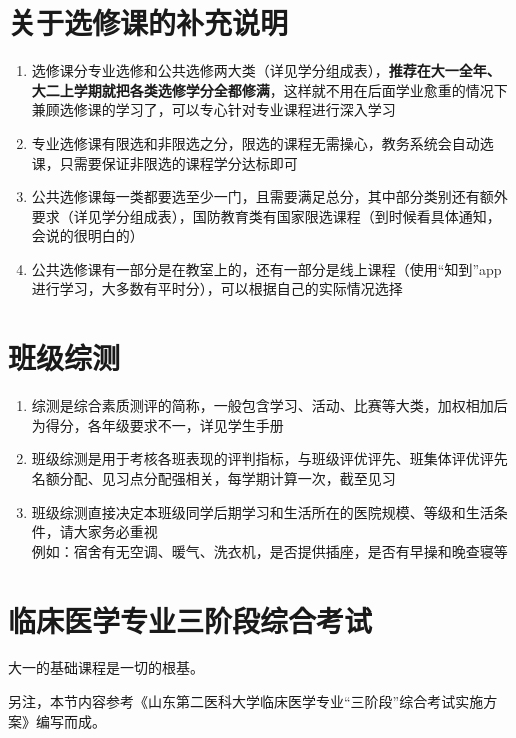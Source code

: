 \section[关于选修课的补充说明]{关于选修课的补充说明}
\begin{enumerate}
    \item 选修课分专业选修和公共选修两大类（详见学分组成表），\textbf{推荐在大一全年、大二上学期就把各类选修学分全都修满}，这样就不用在后面学业愈重的情况下兼顾选修课的学习了，可以专心针对专业课程进行深入学习
    \item 专业选修课有限选和非限选之分，限选的课程无需操心，教务系统会自动选课，只需要保证非限选的课程学分达标即可
    \item 公共选修课每一类都要选至少一门，且需要满足总分，其中部分类别还有额外要求（详见学分组成表），国防教育类有国家限选课程（到时候看具体通知，会说的很明白的）
    \item 公共选修课有一部分是在教室上的，还有一部分是线上课程（使用“知到”app进行学习，大多数有平时分），可以根据自己的实际情况选择
\end{enumerate}

\section[班级综测]{班级综测}
\label{class_evaluation}
\begin{enumerate}
    \item 综测是综合素质测评的简称，一般包含学习、活动、比赛等大类，加权相加后为得分，各年级要求不一，详见学生手册
    \item 班级综测是用于考核各班表现的评判指标，与班级评优评先、班集体评优评先名额分配、见习点分配\footnotemark 强相关，每学期计算一次，截至见习
    \item 班级综测直接决定本班级同学后期学习和生活所在的医院规模、等级和生活条件，请大家务必重视\\
          例如：宿舍有无空调、暖气、洗衣机，是否提供插座，是否有早操和晚查寝\footnotemark 等
\end{enumerate}

\section[临床医学专业三阶段综合考试]{临床医学专业三阶段综合考试}
大一的基础课程是一切的根基。

另注，本节内容参考《山东第二医科大学临床医学专业“三阶段”综合考试实施方案》编写而成。

